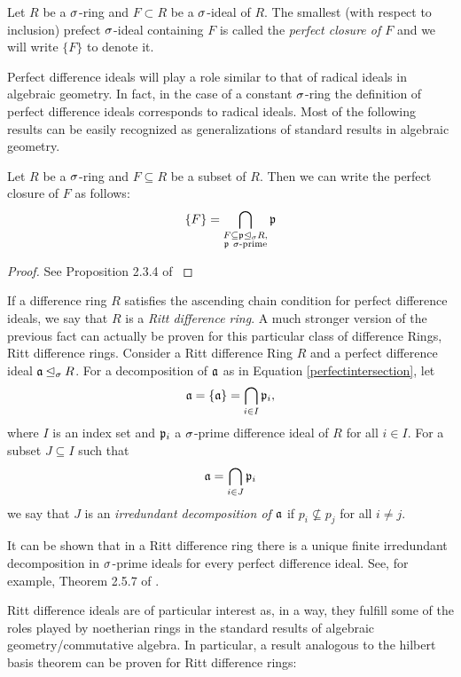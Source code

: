 \begin{defn}
Let $R$ be a $\sigma$-ring and $F \subset R$ be a $\sigma$-ideal of $R$. The smallest (with respect to inclusion) prefect $\sigma$-ideal containing $F$ is called the \emph{perfect closure of $F$} and we will write $\{F\}$ to denote it. 
\end{defn}

Perfect difference ideals will play a role similar to that of radical ideals in algebraic geometry. In fact, in the case of a constant $\sigma$-ring the definition of perfect difference ideals corresponds to radical ideals. Most of the following results can be easily recognized as generalizations of standard results in algebraic geometry. 

\begin{theorem}
Let $R$ be a $\sigma$-ring and $F \subseteq R$ be a subset of $R$. Then we can write the perfect closure of $F$ as follows:
\begin{equation}\label{perfectintersection} \{F\} = \bigcap_{\substack{F \subseteq \mathfrak{p} \unlhd_{\sigma} R, \\ \mathfrak{p} ~ \sigma\text{-prime}}} \mathfrak{p} \end{equation}
\begin{proof} See Proposition 2.3.4 of \cite{levin} \end{proof}
\end{theorem}

If a difference ring $R$ satisfies the ascending chain condition for perfect difference ideals, we say that $R$ is a \emph{Ritt difference ring}.
A much stronger version of the previous fact can actually be proven for this  particular class of difference Rings, Ritt difference rings.  Consider a Ritt difference Ring $R$ and a perfect difference ideal $\mathfrak{a} \unlhd_{\sigma} R$. 
For a decomposition of $\mathfrak{a}$ as in Equation \ref{perfectintersection}, let $$\mathfrak{a} = \{ \mathfrak{a} \} = \bigcap_{i \in I} \mathfrak{p}_i,$$ where $I$ is an index set and $\mathfrak{p}_i$ a $\sigma$-prime difference ideal of $R$ for all $i \in I$.
For a subset $J \subseteq I$ such that $$ \mathfrak{a} = \bigcap_{i \in J} \mathfrak{p}_i$$ we say that $J$ is an \emph{irredundant decomposition of $\mathfrak{a}$}
if $p_i \not \subseteq p_j$ for all $i \neq j.$

It can be shown that in a Ritt difference ring there is a unique finite irredundant decomposition in $\sigma$-prime ideals for every perfect difference ideal. See, for example, Theorem 2.5.7 of \cite{levin}. 

Ritt difference ideals are of particular interest as, in a way, they fulfill some of the roles played by noetherian rings in the standard results of algebraic geometry/commutative algebra.
In particular, a result analogous to the hilbert basis theorem can be proven for Ritt difference rings:

